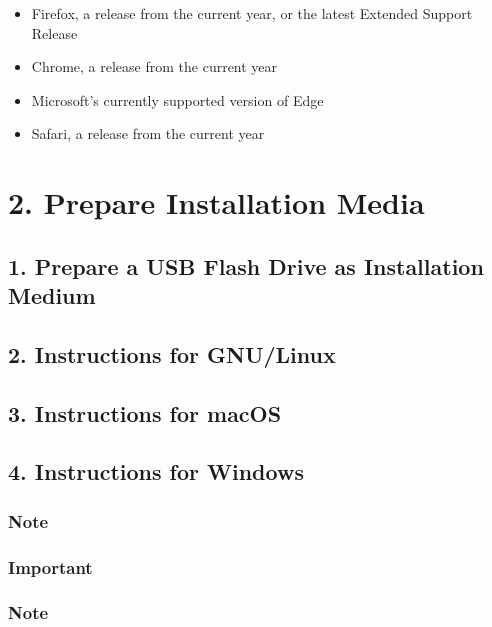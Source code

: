\begin{itemize}[leftmargin=2cm]

	\item Firefox, a release from the current year, or the latest Extended Support Release

	\item Chrome, a release from the current year

	\item Microsoft’s currently supported version of Edge

	\item Safari, a release from the current year

\end{itemize}


\section{2. Prepare Installation Media}

\subsection{1. Prepare a USB Flash Drive as Installation Medium}

\subsection{2. Instructions for GNU/Linux}

\subsection{3. Instructions for macOS}

\subsection{4. Instructions for Windows}

\subsubsection{Note}

\subsubsection{Important}

\subsubsection{Note}

